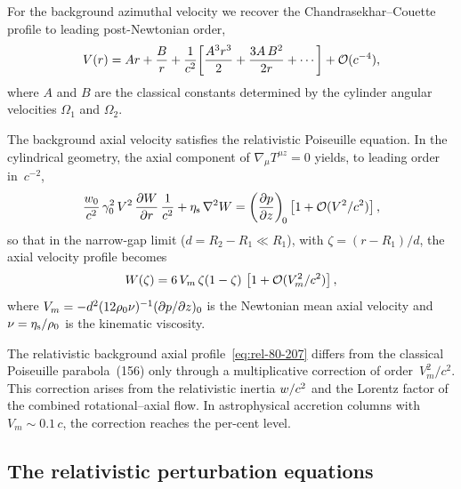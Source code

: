 For the background azimuthal velocity we recover the
Chandrasekhar--Couette profile to leading post-Newtonian order,
\begin{equation}
\label{eq:rel-80-205}
V(r) = A r + \frac{B}{r}
  + \frac{1}{c^{2}}\!\left[\frac{A^{3}r^{3}}{2}
     + \frac{3A\,B^{2}}{2r} + \cdots\right]
  + \mathcal{O}(c^{-4}),
\end{equation}
where $A$ and $B$ are the classical constants determined by the
cylinder angular velocities $\Omega_{1}$ and $\Omega_{2}$.

The background axial velocity satisfies the relativistic Poiseuille
equation.  In the cylindrical geometry, the axial component of
$\nabla_{\!\mu}T^{\mu z}=0$ yields, to leading order in~$c^{-2}$,
\begin{equation}
\label{eq:rel-80-206}
\frac{w_{0}}{c^{2}}\,\gamma_{0}^{2}\,V^{2}\,
  \frac{\partial W}{\partial r}\,\frac{1}{c^{2}}
  + \eta_{\mathrm{s}}\,\nabla^{2}W
  = \left(\frac{\partial p}{\partial z}\right)_{\!0}
    \left[1 + \mathcal{O}(V^{2}/c^{2})\right],
\end{equation}
so that in the narrow-gap limit ($d=R_{2}-R_{1}\ll R_{1}$), with
$\zeta=(r-R_{1})/d$, the axial velocity profile becomes
\begin{equation}
\label{eq:rel-80-207}
W(\zeta) = 6\,V_{m}\,\zeta(1-\zeta)\,
  \left[1 + \mathcal{O}(V_{m}^{2}/c^{2})\right],
\end{equation}
where $V_{m}=-d^{2}(12\rho_0\nu)^{-1}(\partial p/\partial z)_{0}$
is the Newtonian mean axial velocity and $\nu=\eta_{\mathrm{s}}/\rho_0$ is
the kinematic viscosity.

\begin{relcorrection}
The relativistic background axial profile~\eqref{eq:rel-80-207}
differs from the classical Poiseuille parabola~(156) only through a
multiplicative correction of order~$V_{m}^{2}/c^{2}$.  This
correction arises from the relativistic inertia
$w/c^{2}$ and the Lorentz factor of the combined
rotational--axial flow.  In astrophysical accretion columns with
$V_{m}\sim 0.1\,c$, the correction reaches the per-cent level.
\end{relcorrection}

\subsection{The relativistic perturbation equations}\label{sec:rel-80-pert}

